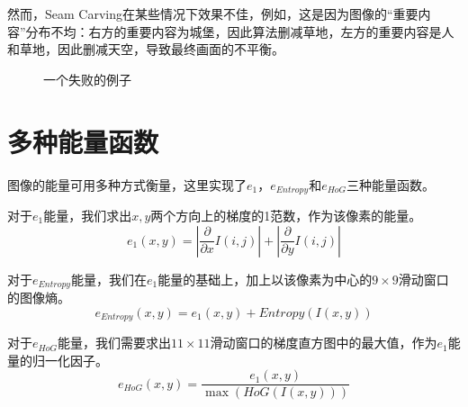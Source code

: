 \documentclass[11pt,a4paper]{article}
\begin{document}
然而，Seam Carving在某些情况下效果不佳，例如，这是因为图像的“重要内容”分布不均：右方的重要内容为城堡，因此算法删减草地，左方的重要内容是人和草地，因此删减天空，导致最终画面的不平衡。

\begin{figure}[H]
    \centering
    \caption{一个失败的例子}
    \label{fig:failure_case}
\end{figure}

\section{多种能量函数}

图像的能量可用多种方式衡量，这里实现了$e_1$，$e_{Entropy}$和$e_{HoG}$三种能量函数。

对于$e_1$能量，我们求出$x,y$两个方向上的梯度的1范数，作为该像素的能量。
\begin{equation}
    e_1(x,y) = \left|\frac{\partial}{\partial x} I(i,j)\right| + \left|\frac{\partial}{\partial y} I(i,j)\right|
\end{equation}

对于$e_{Entropy}$能量，我们在$e_1$能量的基础上，加上以该像素为中心的$9\times 9$滑动窗口的图像熵。
\begin{equation}
    e_{Entropy}(x,y) = e_1(x,y) + Entropy(I(x, y))
\end{equation}

对于$e_{HoG}$能量，我们需要求出$11\times 11$滑动窗口的梯度直方图中的最大值，作为$e_1$能量的归一化因子。
\begin{equation}
    e_{HoG}(x,y) = \frac{e_1(x,y)}{\max(HoG(I(x,y)))}    
\end{equation}
\end{document}

